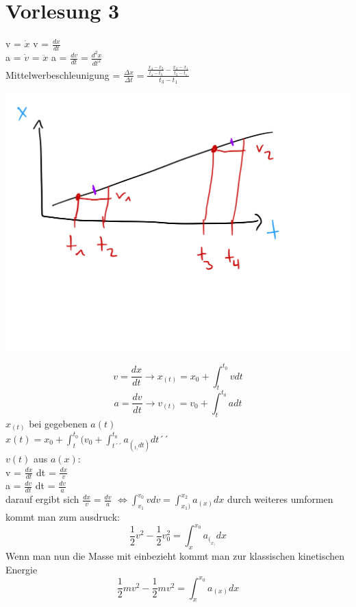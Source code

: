 \documentclass[11pt]{article}
\begin{document}
 \part{Vorlesung 3}
 			v = $\dot{x}$ \qquad v = $\frac{dx}{dt}$ \\
 			a = $\dot{v}$ = $\ddot{x}$ \qquad  a = $\frac{dv}{dt} = \frac{d^2x}{dt^2}$ \\
 			Mittelwerbeschleunigung = $\frac{\Delta x}{\Delta t} = \frac{\frac{x_4 - x_3}{t_4 - t_3} - \frac{x_2 - x_1}{t_2 - t_1}}{t_3 - t_1}$
  	\begin{center}
 	\includegraphics[scale=0.3]{IMG_EFF187166B54-1.jpeg}
 	\end{center}
 \[ v = \frac{dx}{dt} \rightarrow x_(t) = x_0 + \int_{t}^{t_0} v dt \]
\[ a = \frac{dv}{dt} \rightarrow v_(t)  = v_0 + \int_{t}^{t_0} a dt \]
	$x_(t)$ bei gegebenen $a(t)$ \\
		$x(t) = x_0 + \int_{t}^{t_0} (v_0 + \int_{t´´}^{t_0} a_(_t_) dt) dt´´$ \\
		
		$v(t)$ aus $a(x)$: \\
		v = $\frac{dx}{dt}$ \qquad dt = $\frac{dx}{v}$ \\
		a = $\frac{dv}{dt} $ \qquad dt = $\frac{dv}{a}$\\
		darauf ergibt sich $\frac{dx}{v} = \frac{dv}{a}$ $\Leftrightarrow \int_{v_1}^{v_0} v dv = \int_{x_1)}^{x_2} a_(x)dx$ durch weiteres umformen kommt man zum ausdruck: \\
		\[ \frac{1}{2} v^2 -\frac{1}{2} v_0^2 = \int_{x}^{x_0} a_(_x_)dx \]
 Wenn man nun die Masse mit einbezieht kommt man zur klassischen kinetischen Energie\\
  \[ \frac{1}{2} mv^2 - \frac{1}{2} mv^2 = \int_{x}^{x_0} a_(x) dx \]
  
\end{document}
